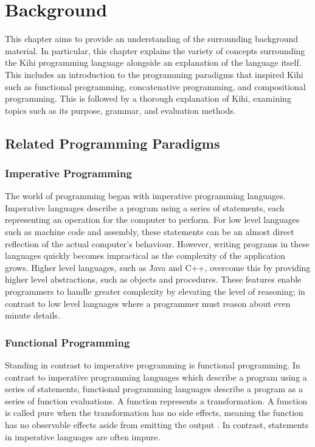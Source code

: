 \chapter{Background} \label{C:background}
This chapter aims to provide an understanding of the surrounding background material. In particular, this chapter explains the variety of concepts surrounding the Kihi programming language alongside an explanation of the language itself. This includes an introduction to the programming paradigms that inspired Kihi such as functional programming, concatenative programming, and compositional programming. This is followed by a thorough explanation of Kihi, examining topics such as its purpose, grammar, and evaluation methods.

\section{Related Programming Paradigms}
\subsection*{Imperative Programming}
The world of programming began with imperative programming languages. Imperative languages describe a program using a series of statements, each representing an operation for the computer to perform. For low level languages such as machine code and assembly, these statements can be an almost direct reflection of the actual computer's behaviour. However, writing programs in these languages quickly becomes impractical as the complexity of the application grows. Higher level languages, such as Java and C++, overcome this by providing higher level abstractions, such as objects and procedures. These features enable programmers to handle greater complexity by elevating the level of reasoning; in contrast to low level languages where a programmer must reason about even minute details.


\subsection*{Functional Programming}

Standing in contrast to imperative programming is functional programming. In contrast to imperative programming languages which describe a program using a series of statements, functional programming languages describe a program as a series of function evaluations. A function represents a transformation. A function is called pure when the transformation has no side effects, meaning the function has no observable effects aside from emitting the output \cite{FunctionalProgrammingHaskellWiki2019}. In contrast, statements in imperative languages are often impure.

